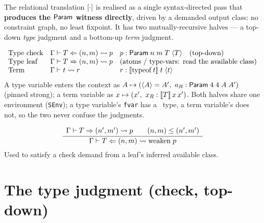 The relational translation $[ \cdot ]$ is realised as a single syntax-directed
pass that \textbf{produces the $\mathsf{Param}$ witness directly}, driven by a demanded
output class: no constraint graph, no least fixpoint. It has two
mutually-recursive halves --- a top-down \emph{type} judgment and a bottom-up
\emph{term} judgment.

\begin{definition}
  \label{def:judgments}
  \[
    \begin{array}{lll}
      \text{Type check} & \Gamma \vdash T \Leftarrow (n,m) \rightsquigarrow p & p : \mathsf{Param}\;n\;m\;T\;\langle T \rangle \quad(\text{top-down})\\
      \text{Type leaf}  & \Gamma \vdash T \Rightarrow (n,m) \rightsquigarrow p & (\text{atoms / type-vars: read the available class})\\
      \text{Term}       & \Gamma \vdash t \rightsquigarrow r                 & r : [\![ \mathrm{typeof}\,t ]\!]\; t\; \langle t \rangle
    \end{array}
  \]
  A type variable enters the context as $A \mapsto (\langle A \rangle = A',\ a_R : \mathsf{Param}\;4\;4\;A\;A')$
  (pinned strong); a term variable as $x \mapsto (x',\ x_R : [\![ T ]\!]\,x\,x')$.
  Both halves share one environment (\texttt{SEnv}); a type variable's
  \texttt{fvar} has a \SortU\ type, a term variable's does not, so the two never
  confuse the judgments.
\end{definition}

\begin{definition}
  \label{def:subsumption}
  \[
    \dfrac{\begin{array}{c} \Gamma \vdash T \Rightarrow (n',m') \rightsquigarrow p \qquad (n,m) \leq (n',m') \end{array}}{ \Gamma \vdash T \Leftarrow (n,m) \rightsquigarrow \mathrm{weaken}\;p }
  \]
  Used to satisfy a check demand from a leaf's inferred available class.
\end{definition}

\section{The type judgment (check, top-down)}
\label{sec:type-rules}

